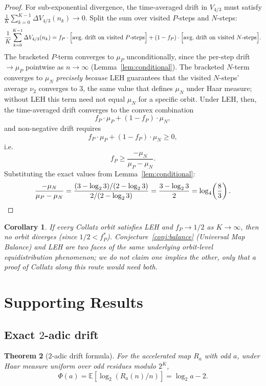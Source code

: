 \documentclass[12pt,reqno]{amsart}
\theoremstyle{plain}
\newtheorem{theorem}{Theorem}[section]
\newtheorem{corollary}[theorem]{Corollary}
\theoremstyle{definition}
\newcommand{\E}{\mathbb{E}}
\newcommand{\nuTwo}{\nu_2}
\newcommand{\logtwo}{\log_2}
\newcommand{\logfour}{\log_4}
\newcommand{\fP}{f_P}
\newcommand{\fPstar}{f_P^*}
\newcommand{\muP}{\mu_P}
\newcommand{\muN}{\mu_N}
\newcommand{\PhiDrift}{\Phi}
\newcommand{\Vmetric}{V_{4/3}}
\begin{document}
\begin{proof}
For sub-exponential divergence, the time-averaged drift in $\Vmetric$ must satisfy
$\frac{1}{K}\sum_{k=0}^{K-1} \Delta \Vmetric(n_k) \to 0$.
Split the sum over visited $P$-steps and $N$-steps:
\[
\frac{1}{K}\sum_{k=0}^{K-1} \Delta \Vmetric(n_k)
= f_P \cdot \Bigl[\text{avg.\ drift on visited } P\text{-steps}\Bigr]
+ (1-f_P) \cdot \Bigl[\text{avg.\ drift on visited } N\text{-steps}\Bigr].
\]
The bracketed $P$-term converges to $\muP$ unconditionally, since the per-step
drift $\to \muP$ pointwise as $n \to \infty$ (Lemma~\ref{lem:conditional}). The
bracketed $N$-term converges to $\muN$ \emph{precisely because} LEH guarantees
that the visited $N$-steps' average $\nuTwo$ converges to $3$, the same value
that defines $\muN$ under Haar measure; without LEH this term need not equal
$\muN$ for a specific orbit. Under LEH, then, the time-averaged drift converges to
the convex combination
\[
f_P \cdot \muP + (1 - f_P) \cdot \muN,
\]
and non-negative drift requires
\[
f_P \cdot \muP + (1 - f_P) \cdot \muN \geq 0,
\]
i.e.
\[
f_P \geq \frac{-\muN}{\muP - \muN}.
\]
Substituting the exact values from Lemma~\ref{lem:conditional}:
\[
\frac{-\muN}{\muP - \muN}
= \frac{(3 - \logtwo 3)/(2 - \logtwo 3)}{2/(2 - \logtwo 3)}
= \frac{3 - \logtwo 3}{2}
= \logfour\!\left(\frac{8}{3}\right). \qedhere
\]
\end{proof}

\begin{corollary}
If every Collatz orbit satisfies LEH and $\fP \to 1/2$ as $K \to \infty$,
then no orbit diverges (since $1/2 < \fPstar$). Conjecture~\ref{conj:balance}
(Universal Map Balance) and LEH are two faces of the same underlying orbit-level
equidistribution phenomenon; we do not claim one implies the other, only that a
proof of Collatz along this route would need both.
\end{corollary}

\section{Supporting Results}\label{sec:supporting}

\subsection{Exact $2$-adic drift}

\begin{theorem}[$2$-adic drift formula]\label{thm:drift2adic}
For the accelerated map $R_a$ with odd $a$, under Haar measure uniform over
odd residues modulo $2^K$,
\begin{equation}\label{eq:drift2adic}
\PhiDrift(a) = \E[\logtwo(R_a(n)/n)] = \logtwo a - 2.
\end{equation}
\end{theorem}
\end{document}
